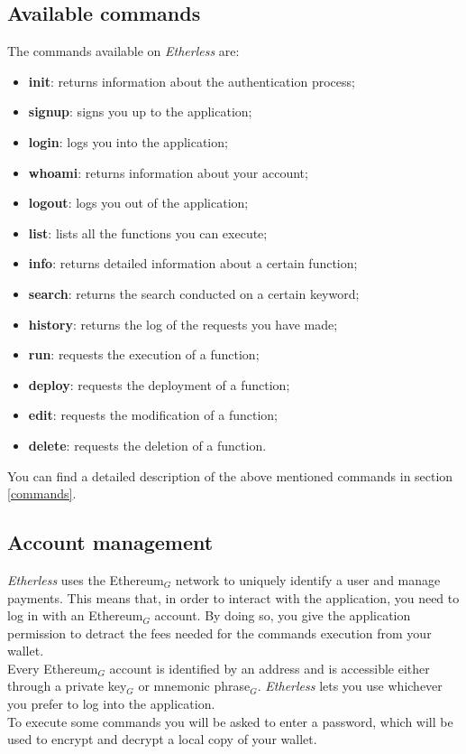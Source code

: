 \subsection{Available commands}
\noindent The commands available on \textit{Etherless} are:
\begin{itemize}
	\item \textbf{init}: returns information about the authentication process;
	\item \textbf{signup}: signs you up to the application;
	\item \textbf{login}: logs you into the application;
	\item \textbf{whoami}: returns information about your account;
	\item \textbf{logout}: logs you out of the application;
	\item \textbf{list}: lists all the functions you can execute;
	\item \textbf{info}: returns detailed information about a certain function;
	\item \textbf{search}: returns the search conducted on a certain keyword;
	\item \textbf{history}: returns the log of the requests you have made;
	\item \textbf{run}: requests the execution of a function;
	\item \textbf{deploy}: requests the deployment of a function;
	\item \textbf{edit}: requests the modification of a function;
	\item \textbf{delete}: requests the deletion of a function.
\end{itemize}
You can find a detailed description of the above mentioned commands in section \ref{commands}.

\subsection{Account management}
\textit{Etherless} uses the Ethereum$_{G}$ network to uniquely identify a user and manage payments. This means that, in order to interact with the application, you need to log in with an Ethereum$_{G}$ account. By doing so, you give the application permission to detract the fees needed for the commands execution from your wallet. \\
Every Ethereum$_{G}$ account is identified by an address and is accessible either through a private key$_{G}$ or mnemonic phrase$_{G}$. \textit{Etherless} lets you use whichever you prefer to log into the application. \\
To execute some commands you will be asked to enter a password, which will be used to encrypt and decrypt a local copy of your wallet.

